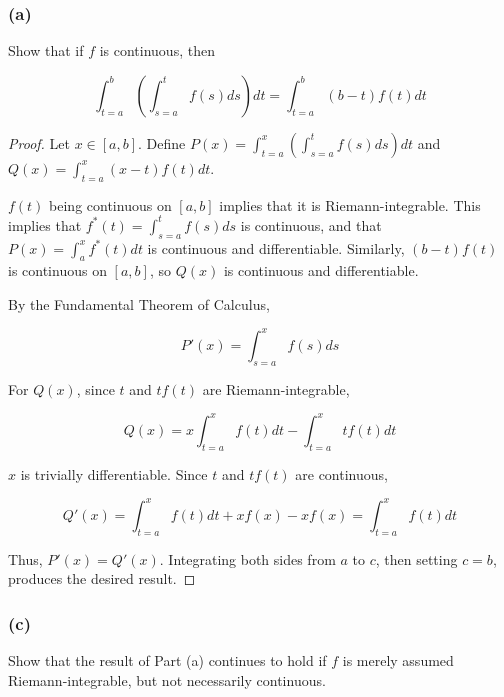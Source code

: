 \documentclass{amsart}
\begin{document}
\subsubsection*{(a)}

Show that if $f$ is continuous, then

\[
\int_{t=a}^b \left(\int_{s=a}^t f(s) ds \right) dt
= \int_{t=a}^b (b-t) f(t) dt
\]

\begin{proof}

Let $x \in [a, b]$. Define $P(x) = \int_{t=a}^x \left(\int_{s=a}^t f(s) ds \right) dt$ and $Q(x) = \int_{t=a}^x (x-t) f(t) dt$.

$f(t)$ being continuous on $[a, b]$ implies that it is Riemann-integrable. This implies that $f^*(t) = \int_{s=a}^t f(s) ds$ is continuous, and that $P(x) = \int_a^x f^*(t)dt$ is continuous and differentiable. Similarly, $(b-t)f(t)$ is continuous on $[a, b]$, so $Q(x)$ is continuous and differentiable.

By the Fundamental Theorem of Calculus,

\[
P'(x) = \int_{s=a}^x f(s) ds
\]

For $Q(x)$, since $t$ and $tf(t)$ are Riemann-integrable,

\[
Q(x) = x \int_{t=a}^x f(t) dt - \int_{t=a}^x t f(t) dt
\]

$x$ is trivially differentiable. Since $t$ and $tf(t)$ are continuous,

\[
Q'(x) = \int_{t=a}^x f(t) dt + x f(x) - x f(x) = \int_{t=a}^x f(t) dt
\]

Thus, $P'(x) = Q'(x)$. Integrating both sides from $a$ to $c$, then setting $c = b$, produces the desired result.

\end{proof}

\subsubsection*{(c)}

Show that the result of Part (a) continues to hold if $f$ is merely assumed Riemann-integrable, but not necessarily continuous.
\end{document}
